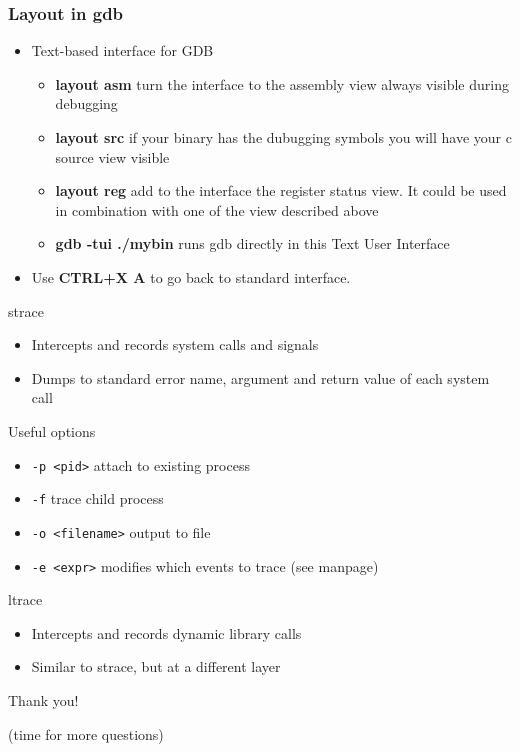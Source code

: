 \documentclass[]{beamer}
\begin{document}
\begin{frame}
  \frametitle{Layout in gdb}
  \begin{itemize}
  \item{Text-based interface for GDB}
    \begin{itemize}
    \item{{\bf layout asm} turn the interface to the assembly view always visible during debugging}
    \item{{\bf layout src} if your binary has the dubugging symbols you will have your c source view visible}
    \item{{\bf layout reg} add to the interface the register status view. It could be used in combination with one of the view described above}
    \item{{\bf gdb -tui ./mybin} runs gdb directly in this Text User Interface}
    \end{itemize}
  \item{Use {\bf CTRL+X A} to go back to standard interface.}
  \end{itemize}
\end{frame}

\begin{frame}{strace}
	\begin{itemize}
		\item Intercepts and records system calls and signals
		\item Dumps to standard error name, argument and return value of each system call
	\end{itemize}

	\begin{block}{Useful options}
		\begin{itemize}
			\item {\tt -p <pid>} attach to existing process
			\item {\tt -f} trace child process
			\item {\tt -o <filename>} output to file
			\item {\tt -e <expr>} modifies which events to trace (see manpage)
		\end{itemize}
	\end{block}
\end{frame}

\begin{frame}{ltrace}
	\begin{itemize}
		\item Intercepts and records dynamic library calls
		\item Similar to strace, but at a different layer
	\end{itemize}
\end{frame}

\begin{frame}[standout]
    Thank you!

    (time for more questions)
\end{frame}
\end{document}
